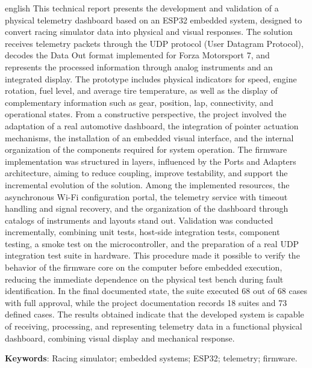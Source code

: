 \documentclass[
  12pt,
  oneside,
  a4paper,
  chapter=TITLE,
  section=TITLE,
  subsection=TITLE,
  brazil
]{abntex2}
\renewcommand{\listfigurename}{LISTA DE ILUSTRAÇÕES}
\renewcommand{\texttt}[1]{\begingroup\ttfamily\seqsplit{#1}\endgroup}
\begin{document}
\begin{resumo}[Abstract]
\begin{otherlanguage*}{english}
This technical report presents the development and validation of a physical telemetry dashboard based on an ESP32 embedded system, designed to convert racing simulator data into physical and visual responses. The solution receives telemetry packets through the UDP protocol (User Datagram Protocol), decodes the Data Out format implemented for Forza Motorsport 7, and represents the processed information through analog instruments and an integrated display. The prototype includes physical indicators for speed, engine rotation, fuel level, and average tire temperature, as well as the display of complementary information such as gear, position, lap, connectivity, and operational states. From a constructive perspective, the project involved the adaptation of a real automotive dashboard, the integration of pointer actuation mechanisms, the installation of an embedded visual interface, and the internal organization of the components required for system operation. The firmware implementation was structured in layers, influenced by the Ports and Adapters architecture, aiming to reduce coupling, improve testability, and support the incremental evolution of the solution. Among the implemented resources, the asynchronous Wi-Fi configuration portal, the telemetry service with timeout handling and signal recovery, and the organization of the dashboard through catalogs of instruments and layouts stand out. Validation was conducted incrementally, combining unit tests, host-side integration tests, component testing, a smoke test on the microcontroller, and the preparation of a real UDP integration test suite in hardware. This procedure made it possible to verify the behavior of the firmware core on the computer before embedded execution, reducing the immediate dependence on the physical test bench during fault identification. In the final documented state, the \texttt{test\_native} suite executed 68 out of 68 cases with full approval, while the project documentation records 18 suites and 73 defined cases. The results obtained indicate that the developed system is capable of receiving, processing, and representing telemetry data in a functional physical dashboard, combining visual display and mechanical response.\par\vspace{\onelineskip}

\textbf{Keywords}: Racing simulator; embedded systems; ESP32; telemetry; firmware.
\end{otherlanguage*}
\end{resumo}
\pdfbookmark[0]{\listfigurename}{lof}
\listoffigures*
\cleardoublepage
\end{document}
